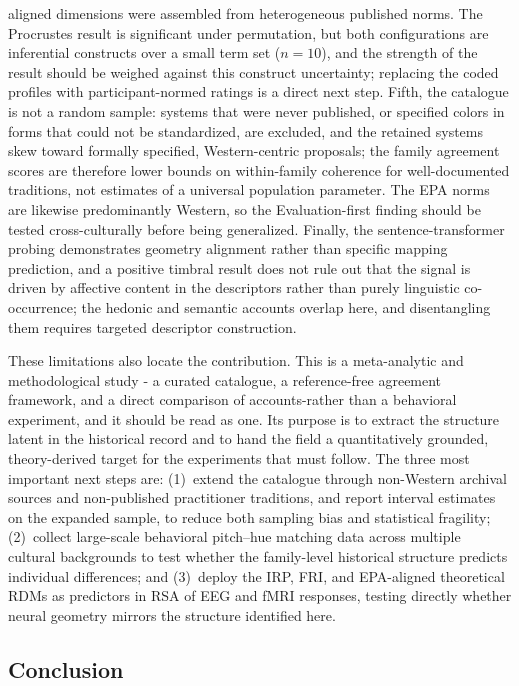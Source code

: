 \documentclass[12pt]{article}
\begin{document}
aligned dimensions were assembled from heterogeneous published norms.
The Procrustes result is significant under permutation, but both
configurations are inferential constructs over a small term set
($n = 10$), and the strength of the result should be weighed against
this construct uncertainty; replacing the coded profiles with
participant-normed ratings is a direct next step.
Fifth, the catalogue is not a random sample:
systems that were never published, or specified colors in forms that
could not be standardized, are excluded, and the retained systems skew
toward formally specified, Western-centric proposals; the family
agreement scores are therefore lower bounds on within-family coherence
for well-documented traditions, not estimates of a universal population
parameter. The EPA norms are likewise predominantly Western, so the
Evaluation-first finding should be tested cross-culturally before
being generalized. Finally, the sentence-transformer probing demonstrates
geometry alignment rather than specific mapping prediction, and a
positive timbral result does not rule out that the signal is driven by
affective content in the descriptors rather than purely linguistic
co-occurrence; the hedonic and semantic accounts overlap here, and
disentangling them requires targeted descriptor construction.

These limitations also locate the contribution. This is a meta-analytic
and methodological study - a curated catalogue, a reference-free
agreement framework, and a direct comparison of accounts-rather
than a behavioral experiment, and it should be read as one. Its purpose
is to extract the structure latent in the historical record and to hand
the field a quantitatively grounded, theory-derived target for the
experiments that must follow. The three most important next steps are:
(1)~extend the catalogue through non-Western archival sources and
non-published practitioner traditions, and report interval estimates on
the expanded sample, to reduce both sampling bias and statistical
fragility; (2)~collect large-scale behavioral pitch--hue matching data
across multiple cultural backgrounds to test whether the family-level
historical structure predicts individual differences; and (3)~deploy
the IRP, FRI, and EPA-aligned theoretical RDMs as predictors in RSA of
EEG and fMRI responses, testing directly whether neural geometry
mirrors the structure identified here.

\subsection{Conclusion}
\end{document}
